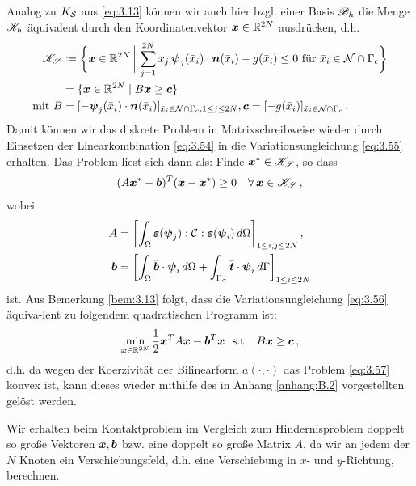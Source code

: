 Analog zu $K_{\mathcal S}$ aus \eqref{eq:3.13} können wir auch hier bzgl. einer Basis $\mathscr B_h$ die Menge $\mathscr K_h$ äquivalent durch den Koordinatenvektor $\boldsymbol x \in \mathbb{R}^{2N}$ ausdrücken, d.h.
\begin{align*}
	\mathscr K_{\mathscr S}  &\coloneqq \bigg\{ \boldsymbol x \in \mathbb{R}^{2N} \,\bigg| \, \sum_{j=1}^{2N} x_j \, \boldsymbol \psi_j(\bar x_i) \cdot \boldsymbol n(\bar x_i) - g(\bar x_i) \le 0 \text{ für } \bar x_i \in \mathcal N \cap \Gamma_c\bigg\} \\
	& = \{ \boldsymbol x \in \mathbb{R}^{2N} \mid B\boldsymbol x \ge \boldsymbol c\} \\
	\text{mit }  B & =  [-\boldsymbol \psi_j(\bar x_i)\cdot \boldsymbol n(\bar x_i)]_{\bar x_i \in \mathcal N \cap \Gamma_c, 1\le j \le 2N} ,\boldsymbol c = [-g(\bar x_i)]_{\bar x_i \in\mathcal N \cap \Gamma_c} \, .
\end{align*}
Damit können wir das diskrete Problem in Matrixschreibweise wieder durch Einsetzen der Linearkombination \eqref{eq:3.54} in die Variationsungleichung \eqref{eq:3.55} erhalten. Das Problem liest sich dann als: Finde $\boldsymbol x^* \in \mathscr K_{\mathscr S}$, so dass
\begin{align}\label{eq:3.56}
	(A\boldsymbol x^* - \boldsymbol b)^T (\boldsymbol x - \boldsymbol x^*) \ge 0 \quad \forall \, \boldsymbol x\in \mathscr K_{\mathscr S} \, ,
\end{align}
wobei
\begin{align*}
	A &= \left[\int_\Omega \boldsymbol {\varepsilon} (\boldsymbol \psi_j):\mathcal C:\boldsymbol {\varepsilon}(\boldsymbol \psi_i) \, d\Omega\right]_{1 \le i,j\le 2N} , \\
	 \boldsymbol b& = \left[ \int_\Omega \bar{\boldsymbol b} \cdot \boldsymbol\psi_i \, d\Omega + \int_{\Gamma_\sigma} \bar{\boldsymbol 	t} \cdot \boldsymbol\psi_i \, d\Gamma\right]_{1\le i \le 2N}
\end{align*}
ist. Aus Bemerkung \ref{bem:3.13} folgt, dass die Variationsungleichung \eqref{eq:3.56} äquiva-lent zu folgendem quadratischen Programm ist:
\begin{align}\label{eq:3.57}
\min_{\bs x\in \R^{2N}} \frac 1 2 \bs x^T A \bs x - \bs b^T \bs x \ \text{ s.t. } \ B\bs x \ge \bs c \, ,
\end{align}
d.h. da wegen der Koerzivität der Bilinearform $a(\cdot,\cdot)$ das Problem \eqref{eq:3.57} konvex ist, kann dieses wieder mithilfe des in Anhang \ref{anhang:B.2} vorgestellten  gelöst werden.

\begin{bem}\label{bem:3.25}
Wir erhalten beim Kontaktproblem im Vergleich zum Hindernisproblem  doppelt so große Vektoren $\boldsymbol x, \boldsymbol b$ bzw. eine doppelt so große Matrix $A$, da wir an jedem der $N$ Knoten ein Verschiebungsfeld, d.h. eine Verschiebung in $x$- und $y$-Richtung, berechnen.
\end{bem}





\newpage

